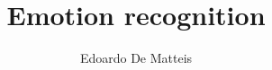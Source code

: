 \documentclass{article}
\title{Emotion recognition}
\author{Edoardo De Matteis}
\begin{document}
    \maketitle

    \tableofcontents
    \clearpage

    
    
    
    
    

    {}
    
\end{document}
